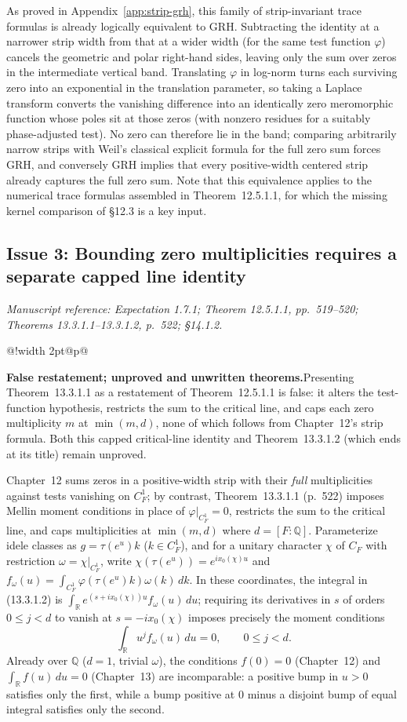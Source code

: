 \documentclass[11pt,letterpaper]{article}
\makeatletter
\newcommand{\msloc}[1]{%
  {\small\color{locgray}\itshape Manuscript reference: #1.}\par\nobreak\vspace{3pt}\@afterindentfalse\@afterheading
}
\newcommand{\issuefinding}[2]{%
  \begingroup
  \setlength{\fboxsep}{0pt}%
  \noindent\colorbox{barbg}{%
    \begin{tabular}{@{}!{\color{baraccent}\vrule width 2pt}@{\hspace{8pt}}p{\dimexpr\linewidth-18pt\relax}@{\hspace{8pt}}}
      \rule{0pt}{11.5pt}\small\textbf{\color{baraccent}#1}\enspace #2\rule[-4.5pt]{0pt}{0pt}
    \end{tabular}%
  }%
  \endgroup
  \par\nobreak\vspace{4.5pt}\@afterindentfalse\@afterheading
}
\newcommand{\Q}{\mathbb{Q}}
\newcommand{\R}{\mathbb{R}}
\newcommand{\dd}{\,d}
\makeatother
\begin{document}
As proved in Appendix~\ref{app:strip-grh}, this family of strip-invariant trace formulas is already logically equivalent to GRH. Subtracting the identity at a narrower strip width from that at a wider width (for the same test function $\varphi$) cancels the geometric and polar right-hand sides, leaving only the sum over zeros in the intermediate vertical band. Translating $\varphi$ in log-norm turns each surviving zero into an exponential in the translation parameter, so taking a Laplace transform converts the vanishing difference into an identically zero meromorphic function whose poles sit at those zeros (with nonzero residues for a suitably phase-adjusted test). No zero can therefore lie in the band; comparing arbitrarily narrow strips with Weil's classical explicit formula for the full zero sum forces GRH, and conversely GRH implies that every positive-width centered strip already captures the full zero sum. Note that this equivalence applies to the numerical trace formulas assembled in Theorem~12.5.1.1, for which the missing kernel comparison of \S12.3 is a key input.

\subsection{Issue 3: Bounding zero multiplicities requires a separate capped line identity}
\msloc{Expectation 1.7.1; Theorem 12.5.1.1, pp.~519--520; Theorems 13.3.1.1--13.3.1.2, p.~522; \S14.1.2}
\issuefinding{False restatement; unproved and unwritten theorems.}{Presenting Theorem~13.3.1.1 as a restatement of Theorem~12.5.1.1 is false: it alters the test-function hypothesis, restricts the sum to the critical line, and caps each zero multiplicity $m$ at $\min(m,d)$, none of which follows from Chapter~12's strip formula. Both this capped critical-line identity and Theorem~13.3.1.2 (which ends at its title) remain unproved.}

Chapter~12 sums zeros in a positive-width strip with their \emph{full} multiplicities against tests vanishing on $C_F^1$; by contrast, Theorem~13.3.1.1 (p.~522) imposes Mellin moment conditions in place of $\varphi|_{C_F^1}=0$, restricts the sum to the critical line, and caps multiplicities at $\min(m,d)$ where $d=[F:\Q]$. Parameterize idele classes as $g = \tau(e^u)k$ ($k\in C_F^1$), and for a unitary character $\chi$ of $C_F$ with restriction $\omega = \chi|_{C_F^1}$, write $\chi(\tau(e^u)) = e^{ix_0(\chi)u}$ and $f_\omega(u) = \int_{C_F^1}\varphi(\tau(e^u)k)\omega(k)\dd k$. In these coordinates, the integral in (13.3.1.2) is $\int_{\R} e^{(s+ix_0(\chi))u} f_\omega(u)\dd u$; requiring its derivatives in $s$ of orders $0 \le j < d$ to vanish at $s = -ix_0(\chi)$ imposes precisely the moment conditions
\[
  \int_{\R} u^j f_\omega(u)\dd u = 0, \qquad 0 \le j < d.
\]
Already over $\Q$ ($d=1$, trivial $\omega$), the conditions $f(0)=0$ (Chapter~12) and $\int_{\R} f(u)\dd u = 0$ (Chapter~13) are incomparable: a positive bump in $u>0$ satisfies only the first, while a bump positive at $0$ minus a disjoint bump of equal integral satisfies only the second.
\end{document}
